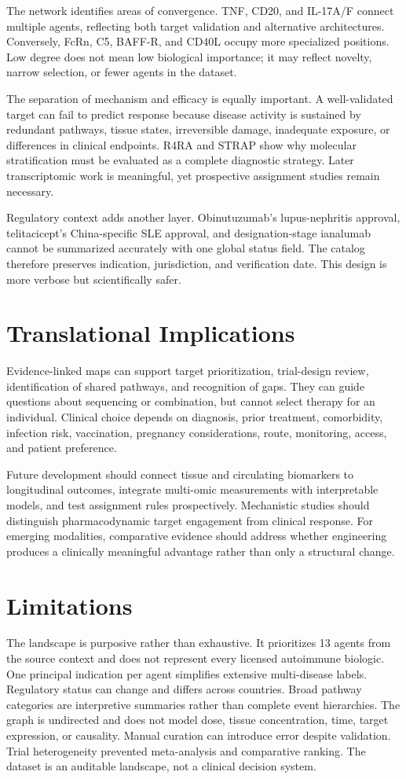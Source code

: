 \documentclass[12pt,a4paper]{article}
\begin{document}
The network identifies areas of convergence. TNF, CD20, and IL-17A/F connect multiple agents, reflecting both target validation and alternative architectures. Conversely, FcRn, C5, BAFF-R, and CD40L occupy more specialized positions. Low degree does not mean low biological importance; it may reflect novelty, narrow selection, or fewer agents in the dataset.

The separation of mechanism and efficacy is equally important. A well-validated target can fail to predict response because disease activity is sustained by redundant pathways, tissue states, irreversible damage, inadequate exposure, or differences in clinical endpoints. R4RA and STRAP show why molecular stratification must be evaluated as a complete diagnostic strategy. Later transcriptomic work is meaningful, yet prospective assignment studies remain necessary.

Regulatory context adds another layer. Obinutuzumab's lupus-nephritis approval, telitacicept's China-specific SLE approval, and designation-stage ianalumab cannot be summarized accurately with one global status field. The catalog therefore preserves indication, jurisdiction, and verification date. This design is more verbose but scientifically safer.

\section{Translational Implications}
Evidence-linked maps can support target prioritization, trial-design review, identification of shared pathways, and recognition of gaps. They can guide questions about sequencing or combination, but cannot select therapy for an individual. Clinical choice depends on diagnosis, prior treatment, comorbidity, infection risk, vaccination, pregnancy considerations, route, monitoring, access, and patient preference.

Future development should connect tissue and circulating biomarkers to longitudinal outcomes, integrate multi-omic measurements with interpretable models, and test assignment rules prospectively. Mechanistic studies should distinguish pharmacodynamic target engagement from clinical response. For emerging modalities, comparative evidence should address whether engineering produces a clinically meaningful advantage rather than only a structural change.

\section{Limitations}
The landscape is purposive rather than exhaustive. It prioritizes 13 agents from the source context and does not represent every licensed autoimmune biologic. One principal indication per agent simplifies extensive multi-disease labels. Regulatory status can change and differs across countries. Broad pathway categories are interpretive summaries rather than complete event hierarchies. The graph is undirected and does not model dose, tissue concentration, time, target expression, or causality. Manual curation can introduce error despite validation. Trial heterogeneity prevented meta-analysis and comparative ranking. The dataset is an auditable landscape, not a clinical decision system.
\end{document}

